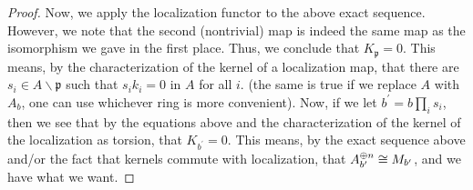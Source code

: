 \begin{proof}
	Now, we apply the localization functor to the above
	exact sequence. 
	However, we note that the second (nontrivial) map
	is indeed the same map as the isomorphism we
	gave in the first place.
	Thus, we conclude that \(K_{\mathfrak{p}} = 0\).
	This means, by the characterization
	of the kernel of a localization map,
	that there are \(s_{i} \in A \smallsetminus \mathfrak{p}\) 
	such that \(s_{i}k_{i} = 0\) in \(A\) for all \(i\).
	(the same is true if we replace  \(A\) with \(A_{b}\),
	one can use whichever ring is more convenient).
	Now, if we let 
	\(b^{\prime} = b \prod_{i}^{} s_{i} \),
	then we see that by the equations above
	and the characterization of the kernel of the localization
	as torsion, that
	\(K_{b^{\prime}} = 0\).
	This means, by the exact sequence above and/or the fact
	that kernels commute with localization,
	that \(A_{b^{\prime}}^{\oplus n} \cong M_{b^{\prime}}\),
	and we have what we want.
	
\end{proof}

